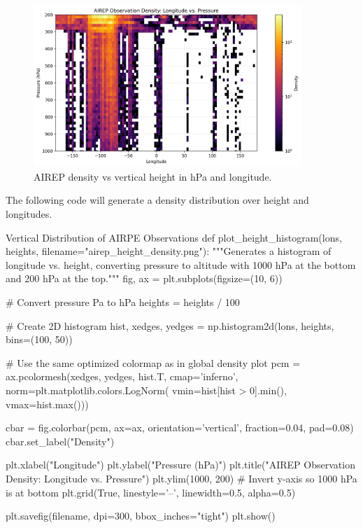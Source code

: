\begin{figure}[ht]
    \centering
    \includegraphics[width=0.9\textwidth]{images/airep_height_density.png}
    \caption{AIREP density vs vertical height in hPa and longitude.}
    \label{fig:airep_plot}
\end{figure}

The following code will generate a density distribution over height and longitudes. 

\begin{codeonly}{Vertical Distribution of AIRPE Observations}
def plot_height_histogram(lons, heights,
                           filename="airep_height_density.png"):
    """Generates a histogram of longitude vs. height, converting pressure
    to altitude with 1000 hPa at the bottom and 200 hPa at the top."""
    fig, ax = plt.subplots(figsize=(10, 6))
    
    # Convert pressure Pa to hPa 
    heights = heights / 100 
    
    # Create 2D histogram
    hist, xedges, yedges = np.histogram2d(lons, heights,
                                          bins=(100, 50))
    
    # Use the same optimized colormap as in global density plot
    pcm = ax.pcolormesh(xedges, yedges, hist.T, cmap='inferno',
                        norm=plt.matplotlib.colors.LogNorm(
                            vmin=hist[hist > 0].min(),
                            vmax=hist.max()))
    
    cbar = fig.colorbar(pcm, ax=ax, orientation='vertical',
                        fraction=0.04, pad=0.08)
    cbar.set_label("Density")
    
    plt.xlabel("Longitude")
    plt.ylabel("Pressure (hPa)")
    plt.title("AIREP Observation Density: Longitude vs. Pressure")
    plt.ylim(1000, 200)  # Invert y-axis so 1000 hPa is at bottom
    plt.grid(True, linestyle='--', linewidth=0.5, alpha=0.5)
    
    plt.savefig(filename, dpi=300, bbox_inches="tight")
    plt.show()
\end{codeonly}


